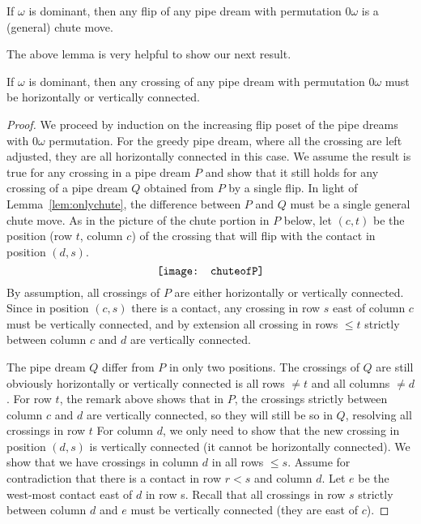 \begin{lemma}\label{lem:onlychute} 
If $\omega$ is dominant, then any flip of any pipe dream with permutation $0\omega$ is a (general) chute move.
\end{lemma}

The above lemma is very helpful to show our next result.

\begin{lemma}\label{lem:hv_connected} 
If $\omega$ is dominant, then any crossing of any pipe dream with permutation $0\omega$ must be horizontally or vertically connected.
\end{lemma}

\begin{proof}
We proceed by induction on the increasing flip poset of the pipe dreams with $0\omega$ permutation. 
For the greedy pipe dream, where all the crossing are left adjusted, they are all horizontally connected in this case.
We assume the result is true for any crossing in a pipe dream $P$ and show that it still holds  for any crossing of a pipe dream  $Q$ obtained from $P$ by a single flip.
In light of Lemma~\ref{lem:onlychute}, the difference between $P$ and $Q$ must be a single general chute move. As in the picture of the chute portion in $P$ below, 
let $(c,t)$ be the position (row $t$, column $c$) of the crossing that will flip with the contact in position $(d,s)$.
$$	\centerline{\texttt{[image: chuteofP]}}  $$
By assumption, all crossings of  $P$ are either horizontally or vertically connected. Since in position $(c,s)$ there is a contact, any crossing in row $s$ east of column $c$ must
be vertically connected, and by extension all crossing in rows $\le t$ strictly between column $c$ and $d$ are vertically connected.

The pipe dream $Q$ differ from $P$ in only two positions. The crossings of $Q$ are still obviously horizontally or vertically connected is all rows $\ne t$ and all columns $\ne d$.
For row $t$, the remark above shows that in $P$, the crossings strictly between column $c$ and $d$ are vertically connected, so they will still be so in $Q$, resolving all crossings in row $t$
For column $d$, we only need to show that the new crossing in position $(d,s)$ is vertically connected (it cannot be horizontally connected).
We show that we have crossings in column $d$ in all rows $\le s$. Assume for contradiction that there is a contact in row $r<s$ and column $d$.
Let $e$ be the west-most contact east of $d$ in row s. Recall that all crossings in row $s$ strictly between column $d$ and $e$ must be vertically connected (they are east of $c$).


\end{proof}
